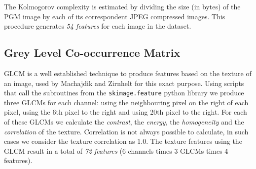 \documentclass[11pt,a4paper,twoside,openright]{report}
\begin{document}
The Kolmogorov complexity is estimated by dividing the size (in bytes) of the
PGM image by each of its correspondent JPEG compressed images.  This procedure
generates \emph{54 features} for each image in the dataset.


\subsection{Grey Level Co-occurrence Matrix}

GLCM is a well established technique to produce features based on the texture
of an image, used by Machajdik \cite{mach10clas} and Zirnhelt
\cite{zirnhelt07art} for this exact purpose.  Using scripts that call the
subroutines from the \texttt{skimage.feature} python library we produce three
GLCMs for each channel: using the neighbouring pixel on the right of each
pixel, using the 6th pixel to the right and using 20th pixel to the right.  For
each of these GLCMs we calculate the \emph{contrast}, the \emph{energy}, the
\emph{homogeneity} and the \emph{correlation} of the texture.  Correlation is
not always possible to calculate, in such cases we consider the texture
correlation as 1.0.  The texture features using the GLCM result in a total of
\emph{72 features} (6 channels times 3 GLCMs times 4 features).
\end{document}
